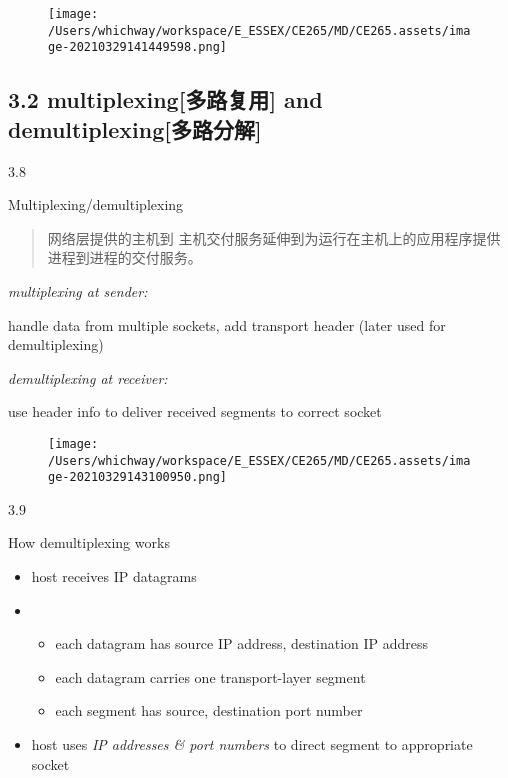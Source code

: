 \documentclass[
]{article}
\begin{document}
\begin{figure}
\centering
\texttt{[image: /Users/whichway/workspace/E\_ESSEX/CE265/MD/CE265.assets/image-20210329141449598.png]}
\caption{}
\end{figure}

\hypertarget{32-multiplexingux591aux8defux590dux7528-and-demultiplexingux591aux8defux5206ux89e3}{%
\subsection{3.2 multiplexing{[}多路复用{]} and
demultiplexing{[}多路分解{]}}\label{32-multiplexingux591aux8defux590dux7528-and-demultiplexingux591aux8defux5206ux89e3}}

3.8

Multiplexing/demultiplexing

\begin{quote}
网络层提供的主机到
主机交付服务延伸到为运行在主机上的应用程序提供进程到进程的交付服务。
\end{quote}

\emph{multiplexing at sender:}

handle data from multiple sockets, add transport header (later used for
demultiplexing)

\emph{demultiplexing at receiver:}

use header info to deliver received segments to correct socket

\begin{figure}
\centering
\texttt{[image: /Users/whichway/workspace/E\_ESSEX/CE265/MD/CE265.assets/image-20210329143100950.png]}
\caption{}
\end{figure}

3.9

How demultiplexing works

\begin{itemize}
\item
  host receives IP datagrams
\item
  \begin{itemize}
  \item
    each datagram has source IP address, destination IP address
  \item
    each datagram carries one transport-layer segment
  \item
    each segment has source, destination port number
  \end{itemize}
\item
  host uses \emph{IP addresses \& port numbers} to direct segment to
  appropriate socket
\end{itemize}
\end{document}

